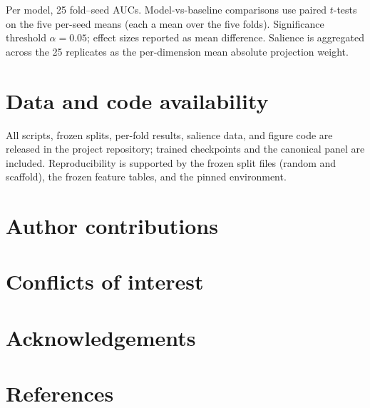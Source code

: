 \documentclass[11pt,a4paper]{article}
\begin{document}
Per model, 25 fold--seed AUCs. Model-vs-baseline comparisons use paired $t$-tests on the five per-seed means (each a mean over the five folds). Significance threshold $\alpha = 0.05$; effect sizes reported as mean difference. Salience is aggregated across the 25 replicates as the per-dimension mean absolute projection weight.

\section{Data and code availability}

All scripts, frozen splits, per-fold results, salience data, and figure code are released in the project repository; trained checkpoints and the canonical panel are included. Reproducibility is supported by the frozen split files (random and scaffold), the frozen feature tables, and the pinned environment.

\section{Author contributions}

\section{Conflicts of interest}

\section{Acknowledgements}

\section*{References}


\end{document}
